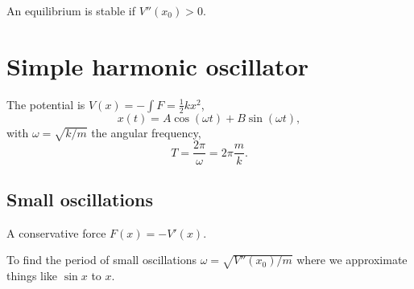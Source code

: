 \documentclass[10pt, a4paper]{article}
\begin{document}
An equilibrium is stable if $V''(x_0) > 0$.

\newpage

\section{Simple harmonic oscillator}
The potential is $V(x) = -\int F = \frac{1}{2}kx ^ 2$,
\[
x(t) = A\cos(\omega t) + B\sin(\omega t),
\]
with $\omega = \sqrt{k / m}$ the angular frequency,
\[
T = \frac{2\pi}{\omega} = 2\pi\frac{m}{k}.
\]

\subsection{Small oscillations}
A conservative force $F(x) = -V'(x)$.

To find the period of small oscillations $\omega = \sqrt{V''(x_0) / m}$ where we approximate things like $\sin{x}$ to $x$.
\end{document}
